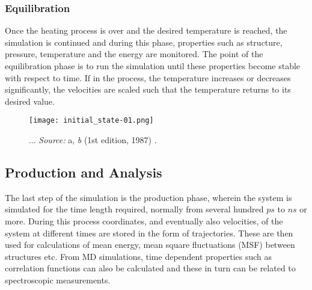 \subsubsection{Equilibration}


Once the heating process is over and the desired temperature is reached, the simulation is continued and during this phase, properties such as structure, pressure, temperature and the energy are monitored. The point of the equilibration phase is to run the simulation until these properties become stable with respect to time. If in the process, the temperature increases or decreases significantly, the velocities are scaled such that the temperature returns to its desired value.

\begin{figure}[H]
\centering
\begin{minipage}[t]{0.8\textwidth}
	\centering
    \texttt{[image: initial\_state-01.png]}
    
    \footnotesize{\caption{...
    \textit{Source:} a, \textit{b} (1st edition, 1987) 
    \cite{ref:AllenTildesley_1ed}.}
    \label{fig:symplettic-integrator}
    }
\end{minipage} 
\end{figure}

\subsection{Production and Analysis}

The last step of the simulation is the production phase, wherein the system is simulated for the time length required, normally from several hundred $ps$ to $ns$ or more. During this process coordinates,  and eventually also velocities, of the system at different times are stored in the form of trajectories.  These are then used for calculations of mean energy, mean square fluctuations (MSF) between structures etc. From MD simulations, time dependent properties such as correlation functions can also be calculated and these in turn can be related to spectroscopic measurements.

